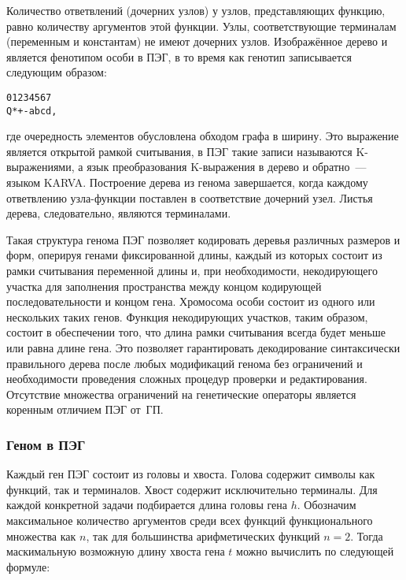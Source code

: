 Количество ответвлений (дочерних узлов) у узлов, представляющих функцию, равно количеству аргументов этой функции. Узлы, соответствующие терминалам (переменным и константам) не имеют дочерних узлов. Изображённое дерево и является фенотипом особи в ПЭГ, в то время как генотип записывается следующим образом:

\begin{samepage}
\begin{verbatim}
01234567
Q*+-abcd,
\end{verbatim}
\end{samepage}

где очередность элементов обусловлена обходом графа в ширину. Это выражение является открытой рамкой считывания, в ПЭГ такие записи называются K-выражениями, а язык преобразования K-выражения в дерево и обратно~--- языком KARVA. Построение дерева из генома завершается, когда каждому ответвлению узла-функции поставлен в соответствие дочерний узел. Листья дерева, следовательно, являются терминалами.

Такая структура генома ПЭГ позволяет кодировать деревья различных размеров и форм, оперируя генами фиксированной длины, каждый из которых состоит из рамки считывания переменной длины и, при необходимости, некодирующего участка для заполнения пространства между концом кодирующей последовательности и концом гена. Хромосома особи состоит из одного или нескольких таких генов. Функция некодирующих участков, таким образом, состоит в обеспечении того, что длина рамки считывания всегда будет меньше или равна длине гена. Это позволяет гарантировать декодирование синтаксически правильного дерева после любых модификаций генома без ограничений и необходимости проведения сложных процедур проверки и редактирования. Отсутствие множества ограничений на генетические операторы является коренным отличием ПЭГ от~ГП.


\subsubsection{Геном в ПЭГ}

Каждый ген ПЭГ состоит из головы и хвоста. Голова содержит символы как функций, так и терминалов. Хвост содержит исключительно терминалы. Для каждой конкретной задачи подбирается длина головы гена $h$. Обозначим максимальное количество аргументов среди всех функций функционального множества как $n$, так для большинства арифметических функций $n=2$. Тогда маскимальную возможную длину хвоста гена $t$ можно вычислить по следующей формуле:

